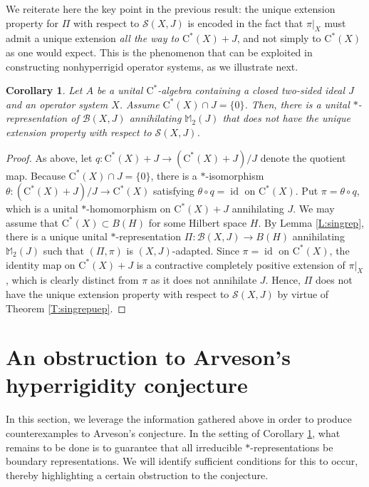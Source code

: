 \documentclass[10pt]{amsart}
\newcommand{\bM}{{\mathbb{M}}}
\newcommand{\B}{{\mathcal{B}}}
\renewcommand{\S}{{\mathcal{S}}}
\newcommand{\rC}{\mathrm{C}}
\newcommand{\id}{\operatorname{id}}
\newtheorem{corollary}[lemma]{Corollary}
\theoremstyle{definition}
\begin{document}
We reiterate here the key point in the previous result: the unique extension property for $\Pi$ with respect to $\S(X,J)$ is encoded in the fact that $\pi|_{X}$ must admit a unique extension \emph{all the way to} $\rC^*(X)+J$, and not simply to $\rC^*(X)$ as one would expect. This is the phenomenon that can be exploited in constructing nonhyperrigid operator systems, as we illustrate next. 



\begin{corollary}\label{C:intnothyperrigid}
Let $A$ be a unital $\rC^*$-algebra containing a closed two-sided ideal $J$ and an operator system $X$. Assume $\rC^*(X)\cap J=\{0\}$. Then, there is a unital  $*$-representation of $\B(X,J)$ annihilating $\bM_2(J)$ that does not have the unique extension property with respect to $\S(X,J)$. 
\end{corollary}
\begin{proof}
As above, let $q:\rC^*(X)+J\to (\rC^*(X)+J)/J$ denote the quotient map.
Because $\rC^*(X)\cap J=\{0\}$,  there is a $*$-isomorphism $\theta:(\rC^*(X)+J)/J\to \rC^*(X)$ satisfying $\theta\circ q=\id$ on $\rC^*(X)$. Put $\pi=\theta\circ q$, which is a unital $*$-homomorphism on $\rC^*(X)+J$ annihilating $J$. We may assume that $\rC^*(X)\subset B(H)$ for some Hilbert space $H$. By Lemma \ref{L:singrep}, there is a unique unital $*$-representation $\Pi:\B(X,J)\to B(H)$ annihilating $\bM_2(J)$ such that $(\Pi,\pi)$ is $(X,J)$-adapted.
Since $\pi=\id$ on $\rC^*(X)$, the identity map on $\rC^*(X)+J$ is a contractive completely positive extension of $\pi|_X$, which is clearly distinct from $\pi$ as it does not annihilate $J$. Hence, $\Pi$ does not have the unique extension property with respect to $\S(X,J)$ by virtue of Theorem \ref{T:singrepuep}.
\end{proof}



\section{An obstruction to Arveson's hyperrigidity conjecture}\label{S:obst}

In this section, we leverage the information gathered above in order to produce counterexamples to Arveson's conjecture. In the setting of Corollary \ref{C:intnothyperrigid}, what remains to be done is to guarantee that all irreducible $*$-representations be boundary representations. We will identify sufficient conditions for this to occur, thereby highlighting a certain obstruction to the conjecture.
\end{document}
